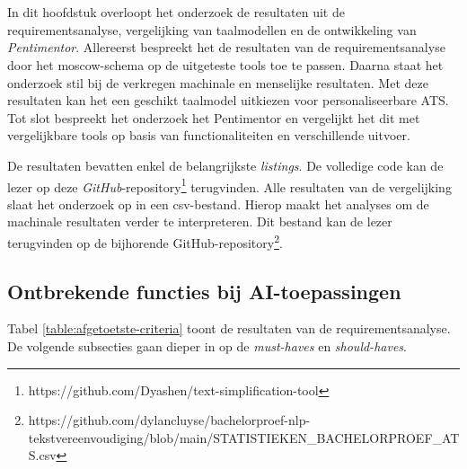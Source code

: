 \chapter{}%
\label{ch:resultaten}

In dit hoofdstuk overloopt het onderzoek de resultaten uit de requirementsanalyse, vergelijking van taalmodellen en de ontwikkeling van \textit{Pentimentor}. Allereerst bespreekt het de resultaten van de requirementsanalyse door het moscow-schema op de uitgeteste tools toe te passen. Daarna staat het onderzoek stil bij de verkregen machinale en menselijke resultaten. Met deze resultaten kan het een geschikt taalmodel uitkiezen voor personaliseerbare ATS. Tot slot bespreekt het onderzoek het Pentimentor en vergelijkt het dit met vergelijkbare tools op basis van functionaliteiten en verschillende uitvoer. 

\medspace

De resultaten bevatten enkel de belangrijkste \textit{listings}. De volledige code kan de lezer op deze \textit{GitHub}-repository\footnote{https://github.com/Dyashen/text-simplification-tool} terugvinden. Alle resultaten van de vergelijking slaat het onderzoek op in een csv-bestand. Hierop maakt het analyses om de machinale resultaten verder te interpreteren. Dit bestand kan de lezer terugvinden op de bijhorende GitHub-repository\footnote{https://github.com/dylancluyse/bachelorproef-nlp-tekstvereenvoudiging/blob/main/STATISTIEKEN\_BACHELORPROEF\_ATS.csv}.

\section{Ontbrekende functies bij AI-toepassingen}

Tabel \ref{table:afgetoetste-criteria} toont de resultaten van de requirementsanalyse. De volgende subsecties gaan dieper in op de \textit{must-haves} en \textit{should-haves}.


